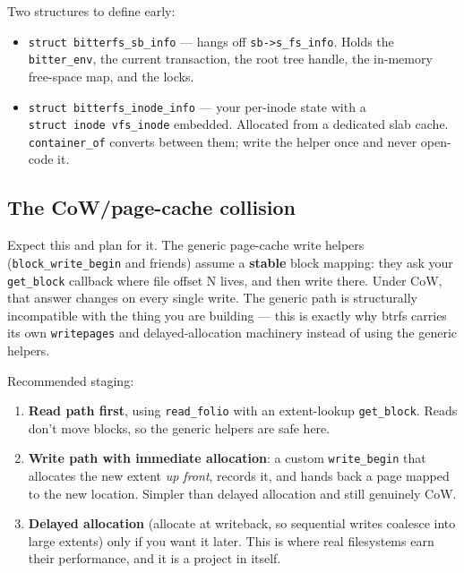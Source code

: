 Two structures to define early:

\begin{itemize}
\tightlist
\item
  \texttt{struct\ bitterfs\_sb\_info} --- hangs off \texttt{sb-\textgreater{}s\_fs\_info}. Holds the \texttt{bitter\_env}, the
  current transaction, the root tree handle, the in-memory free-space map, and the locks.
\item
  \texttt{struct\ bitterfs\_inode\_info} --- your per-inode state with a \texttt{struct\ inode\ vfs\_inode}
  embedded. Allocated from a dedicated slab cache. \texttt{container\_of} converts between them;
  write the helper once and never open-code it.
\end{itemize}

\hypertarget{the-cowpage-cache-collision}{%
\subsection{The CoW/page-cache collision}\label{the-cowpage-cache-collision}}

Expect this and plan for it. The generic page-cache write helpers
(\texttt{block\_write\_begin} and friends) assume a \textbf{stable} block mapping: they ask your
\texttt{get\_block} callback where file offset N lives, and then write there. Under CoW, that
answer changes on every single write. The generic path is structurally incompatible with
the thing you are building --- this is exactly why btrfs carries its own \texttt{writepages} and
delayed-allocation machinery instead of using the generic helpers.

Recommended staging:

\begin{enumerate}
\def\labelenumi{\arabic{enumi}.}
\tightlist
\item
  \textbf{Read path first}, using \texttt{read\_folio} with an extent-lookup \texttt{get\_block}. Reads don't
  move blocks, so the generic helpers are safe here.
\item
  \textbf{Write path with immediate allocation}: a custom \texttt{write\_begin} that allocates the new
  extent \emph{up front}, records it, and hands back a page mapped to the new location.
  Simpler than delayed allocation and still genuinely CoW.
\item
  \textbf{Delayed allocation} (allocate at writeback, so sequential writes coalesce into large
  extents) only if you want it later. This is where real filesystems earn their
  performance, and it is a project in itself.
\end{enumerate}

